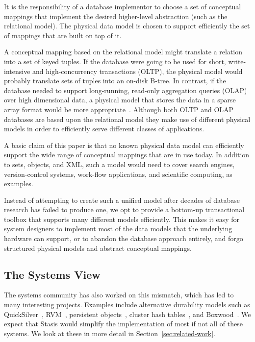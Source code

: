 \documentclass[letterpaper,twocolumn,10pt]{article}
\newcommand{\yad}{Stasis\xspace}
\begin{document}

It is the responsibility of a database implementor to choose a set of
conceptual mappings that implement the desired higher-level
abstraction (such as the relational model).  The physical data model
is chosen to support efficiently the set of mappings that are built on
top of it.

A conceptual mapping based on the relational model might translate a
relation into a set of keyed tuples.  If the database were going to be
used for short, write-intensive and high-concurrency transactions
(OLTP), the physical model would probably translate sets of tuples
into an on-disk B-tree.  In contrast, if the database needed to
support long-running, read-only aggregation queries (OLAP) over high
dimensional data, a physical model that stores the data in a sparse
array format would be more appropriate~\cite{molap}.  Although both
OLTP and OLAP databases are based upon the relational model they make
use of different physical models in order to efficiently serve
different classes of applications.

A basic claim of
this paper is that no known physical data model can efficiently
support the wide range of conceptual mappings that are in use today.
In addition to sets, objects, and XML, such a model would need
to cover search engines, version-control systems, work-flow
applications, and scientific computing, as examples.

Instead of attempting to create such a unified model after decades of
database research has failed to produce one, we opt to provide a
bottom-up transactional toolbox that supports many different models
efficiently.  This makes it easy for system designers to
implement most of the data models that the underlying hardware can
support, or to abandon the database approach entirely, and forgo 
structured physical models and abstract conceptual mappings.

\subsection{The Systems View}
\label{sec:systems}
The systems community has also worked on this mismatch,
which has led to many interesting projects.  Examples include
alternative durability models such as QuickSilver~\cite{experienceWithQuickSilver},
RVM~\cite{lrvm}, persistent objects~\cite{argus}, 
cluster hash tables~\cite{DDS}, and Boxwood~\cite{boxwood}.  We expect that \yad would simplify
the implementation of most if not all of these systems.  We look at
these in more detail in Section~\ref{sec:related-work}.
\end{document}
